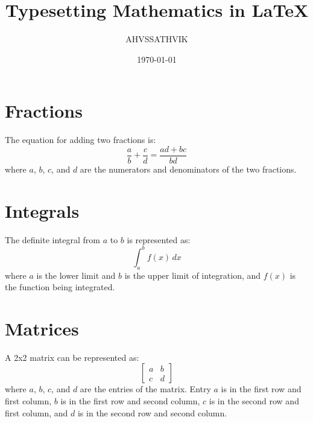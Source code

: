 \documentclass{article}
\title{Typesetting Mathematics in LaTeX}
\author{AHVSSATHVIK}
\date{\today}
\begin{document}
\maketitle

\section{Fractions}
The equation for adding two fractions is:
\[
\frac{a}{b} + \frac{c}{d} = \frac{ad + bc}{bd}
\]
where \(a\), \(b\), \(c\), and \(d\) are the numerators and denominators of the two fractions.

\section{Integrals}
The definite integral from \(a\) to \(b\) is represented as:
\[
\int_{a}^{b} f(x) \, dx
\]
where \(a\) is the lower limit and \(b\) is the upper limit of integration, and \(f(x)\) is the function being integrated.

\section{Matrices}
A 2x2 matrix can be represented as:
\[
\begin{bmatrix}
a & b \\
c & d
\end{bmatrix}
\]
where \(a\), \(b\), \(c\), and \(d\) are the entries of the matrix. Entry \(a\) is in the first row and first column, \(b\) is in the first row and second column, \(c\) is in the second row and first column, and \(d\) is in the second row and second column.
\end{document}
